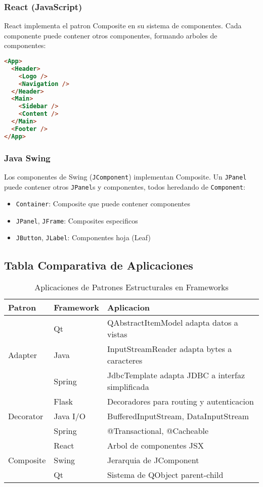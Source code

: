 \documentclass[11pt,a4paper]{article}
\begin{document}
\subsubsection{React (JavaScript)}

React implementa el patron Composite en su sistema de componentes. Cada componente puede contener otros componentes, formando arboles de componentes:

\begin{lstlisting}[language=HTML, caption=Composite en React]
<App>
  <Header>
    <Logo />
    <Navigation />
  </Header>
  <Main>
    <Sidebar />
    <Content />
  </Main>
  <Footer />
</App>
\end{lstlisting}

\subsubsection{Java Swing}

Los componentes de Swing (\texttt{JComponent}) implementan Composite. Un \texttt{JPanel} puede contener otros \texttt{JPanel}s y componentes, todos heredando de \texttt{Component}:

\begin{itemize}
    \item \texttt{Container}: Composite que puede contener componentes
    \item \texttt{JPanel}, \texttt{JFrame}: Composites especificos
    \item \texttt{JButton}, \texttt{JLabel}: Componentes hoja (Leaf)
\end{itemize}

\subsection{Tabla Comparativa de Aplicaciones}

\begin{table}[H]
\centering
\caption{Aplicaciones de Patrones Estructurales en Frameworks}
\begin{tabular}{|p{2.5cm}|p{3.5cm}|p{7cm}|}
\hline
\textbf{Patron} & \textbf{Framework} & \textbf{Aplicacion} \\
\hline
\multirow{3}{*}{Adapter} 
& Qt & QAbstractItemModel adapta datos a vistas \\
& Java & InputStreamReader adapta bytes a caracteres \\
& Spring & JdbcTemplate adapta JDBC a interfaz simplificada \\
\hline
\multirow{3}{*}{Decorator} 
& Flask & Decoradores para routing y autenticacion \\
& Java I/O & BufferedInputStream, DataInputStream \\
& Spring & @Transactional, @Cacheable \\
\hline
\multirow{3}{*}{Composite} 
& React & Arbol de componentes JSX \\
& Swing & Jerarquia de JComponent \\
& Qt & Sistema de QObject parent-child \\
\hline
\end{tabular}
\end{table}
\end{document}
